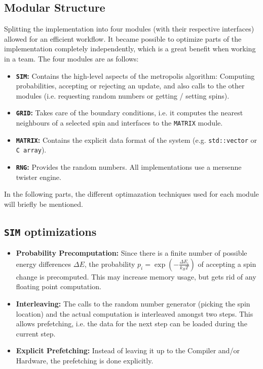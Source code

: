 \documentclass[letterpaper]{article}
\begin{document}
\subsection{Modular Structure} Splitting the implementation into four modules (with their respective interfaces) allowed for an efficient workflow. It became possible to optimize parts of the implementation completely independently, which is a great benefit when working in a team. The four modules are as follows:
\begin{itemize}[noitemsep, topsep = 0pt]
\item \textbf{\texttt{SIM}:} Contains the high-level aspects of the metropolis algorithm: Computing probabilities, accepting or rejecting an update, and also calls to the other modules (i.e. requesting random numbers or getting / setting spins).
\item \textbf{\texttt{GRID}:} Takes care of the boundary conditions, i.e. it computes the nearest neighbours of a selected spin and interfaces to the \texttt{MATRIX} module.
\item \textbf{\texttt{MATRIX}:} Contains the explicit data format  of the system (e.g. \texttt{std::vector} or \texttt{C array}).
\item \textbf{\texttt{RNG}:} Provides the random numbers. All implementations use a mersenne twister engine.
\end{itemize}
In the following parts, the different optimazation techniques used for each module will briefly be mentioned.
\subsection{\texttt{SIM} optimizations}\label{opt:sim}
\begin{itemize}[noitemsep, topsep = 0pt]
\item \textbf{Probability Precomputation:} Since there is a finite number of possible energy differences $\Delta E$, the probability $p_i = \exp{\left(-\frac{\Delta E_i}{k_B T}\right)}$ of accepting a spin change is precomputed. This may increase memory usage, but gets rid of any floating point computation.
\item \textbf{Interleaving:} The calls to the random number generator (picking the spin location) and the actual computation is interleaved amongst two steps. This allows prefetching, i.e. the data for the next step can be loaded during the current step.
\item \textbf{Explicit Prefetching:} Instead of leaving it up to the Compiler and/or Hardware, the prefetching is done explicitly. 
\end{itemize}
\end{document}

